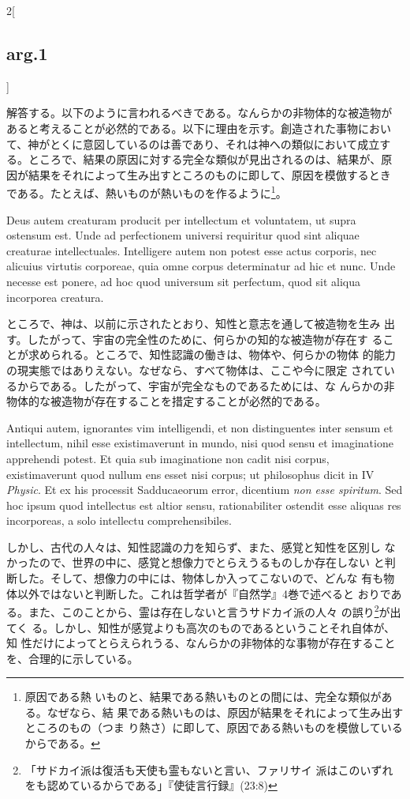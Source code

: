 \documentclass[paper=a4paper,fontsize=10pt,jafontsize=9pt,titlepage]{jlreq}
\begin{document}
\begin{paracol}{2}[\subsection{arg.1}]
\switchcolumn

解答する。以下のように言われるべきである。なんらかの非物体的な被造物が
あると考えることが必然的である。以下に理由を示す。創造された事物におい
て、神がとくに意図しているのは善であり、それは神への類似において成立す
る。ところで、結果の原因に対する完全な類似が見出されるのは、結果が、原
因が結果をそれによって生み出すところのものに即して、原因を模倣するとき
である。たとえば、熱いものが熱いものを作るように\footnote{原因である熱
いものと、結果である熱いものとの間には、完全な類似がある。なぜなら、結
果である熱いものは、原因が結果をそれによって生み出すところのもの（つま
り熱さ）に即して、原因である熱いものを模倣しているからである。}。

\switchcolumn*

Deus autem creaturam producit per intellectum et voluntatem, ut supra
ostensum est. Unde ad perfectionem universi requiritur quod sint
aliquae creaturae intellectuales. Intelligere autem non potest esse
actus corporis, nec alicuius virtutis corporeae, quia omne corpus
determinatur ad hic et nunc. Unde necesse est ponere, ad hoc quod
universum sit perfectum, quod sit aliqua incorporea creatura.

\switchcolumn

ところで、神は、以前に示されたとおり、知性と意志を通して被造物を生み
 出す。したがって、宇宙の完全性のために、何らかの知的な被造物が存在す
 ることが求められる。ところで、知性認識の働きは、物体や、何らかの物体
 的能力の現実態ではありえない。なぜなら、すべて物体は、ここや今に限定
 されているからである。したがって、宇宙が完全なものであるためには、な
 んらかの非物体的な被造物が存在することを措定することが必然的である。

\switchcolumn*

Antiqui autem, ignorantes vim intelligendi, et non distinguentes inter
sensum et intellectum, nihil esse existimaverunt in mundo, nisi quod
sensu et imaginatione apprehendi potest. Et quia sub imaginatione non
cadit nisi corpus, existimaverunt quod nullum ens esset nisi corpus;
ut philosophus dicit in IV {\itshape Physic}. Et ex his processit
Sadducaeorum error, dicentium {\itshape non esse spiritum}. Sed hoc
ipsum quod intellectus est altior sensu, rationabiliter ostendit esse
aliquas res incorporeas, a solo intellectu comprehensibiles.

\switchcolumn

しかし、古代の人々は、知性認識の力を知らず、また、感覚と知性を区別し
 なかったので、世界の中に、感覚と想像力でとらえうるものしか存在しない
 と判断した。そして、想像力の中には、物体しか入ってこないので、どんな
 有も物体以外ではないと判断した。これは哲学者が『自然学』4巻で述べると
 おりである。また、このことから、霊は存在しないと言うサドカイ派の人々
 の誤り\footnote{「サドカイ派は復活も天使も霊もないと言い、ファリサイ
 派はこのいずれをも認めているからである」『使徒言行録』(23:8)}が出てく
 る。しかし、知性が感覚よりも高次のものであるということそれ自体が、知
 性だけによってとらえられうる、なんらかの非物体的な事物が存在すること
 を、合理的に示している。


\end{paracol}
\end{document}
